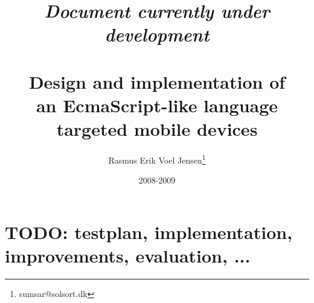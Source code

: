 \documentclass[12pt]{report}
\title{
\emph{Document currently under development} \\ ~ \\
Design and implementation of \\ 
an EcmaScript-like language \\ 
targeted mobile devices}
\author{
  Rasmus Erik Voel Jensen\footnote{
    sumsar@solsort.dk
  }
}
\date{2008-2009}
\begin{document}

\maketitle
\begin{abstract}
\end{abstract}

\setcounter{tocdepth}{3}
\tableofcontents
\listoffigures
\nocite{sicp}






\chapter{TODO: testplan, implementation, improvements, evaluation, ...}

\newpage
{}



\appendix

\newpage
{}
\printindex
\end{document}
